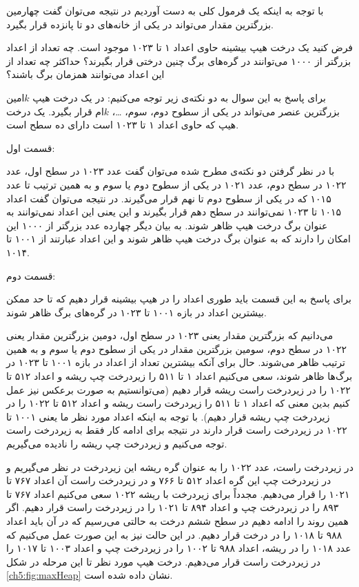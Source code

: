 با توجه به اینکه یک فرمول کلی به دست آوردیم در نتیجه می‌توان گفت چهارمین بزرگترین مقدار می‌تواند در یکی از خانه‌های دو تا پانزده قرار بگیرد.

 فرض کنید یک درخت هیپ  بیشینه حاوی اعداد ۱ تا ۱۰۲۳ موجود است. چه تعداد از اعداد بزرگتر از ۱۰۰۰ می‌توانند در گره‌های برگ چنین درختی قرار بگیرند؟ حداکثر چه تعداد از این اعداد می‌توانند همزمان برگ باشند؟


برای پاسخ به این سوال به دو نکته‌ی زیر توجه می‌کنیم:
 در یک درخت هیپ {$k$}امین بزرگترین عنصر می‌تواند در یکی از سطوح دوم، سوم، {\ldots}، {$k$}ام قرار بگیرد.
  یک درخت هیپ که حاوی اعداد ۱ تا ۱۰۲۳ است دارای ده سطح است.

قسمت اول:

با در نظر گرفتن دو نکته‌ی مطرح شده می‌توان گفت عدد ۱۰۲۳ در سطح اول، عدد ۱۰۲۲ در سطح دوم، عدد ۱۰۲۱ در یکی از سطوح دوم یا سوم و به همین ترتیب تا عدد ۱۰۱۵ که در یکی از سطوح دوم تا نهم قرار می‌گیرند. در نتیجه می‌توان گفت اعداد ۱۰۱۵ تا ۱۰۲۳ نمی‌توانند در سطح دهم قرار بگیرند و این یعنی این اعداد نمی‌توانند به عنوان برگ درخت هیپ ظاهر شوند. به بیان دیگر چهارده عدد بزرگتر از ۱۰۰۰ این امکان را دارند که به عنوان برگ درخت هیپ ظاهر شوند و این اعداد عبارتند از ۱۰۰۱ تا ۱۰۱۴.

قسمت دوم:

برای پاسخ به این قسمت باید طوری اعداد را در هیپ بیشینه قرار دهیم که تا حد ممکن بیشترین اعداد در بازه ۱۰۰۱ تا ۱۰۲۳ در گره‌های برگ ظاهر شوند.

می‌دانیم که بزرگترین مقدار یعنی ۱۰۲۳ در سطح اول، دومین بزرگترین مقدار یعنی ۱۰۲۲ در سطح دوم، سومین بزرگترین مقدار در یکی از سطوح دوم یا سوم و به همین ترتیب ظاهر می‌شوند. حال برای آنکه بیشترین تعداد از اعداد در بازه ۱۰۰۱ تا ۱۰۲۳ در برگ‌ها ظاهر شوند، سعی می‌کنیم اعداد ۱ تا ۵۱۱ را زیردرخت چپ ریشه و اعداد ۵۱۲ تا ۱۰۲۲ را در زیردرخت راست ریشه قرار دهیم (می‌توانستیم به صورت برعکس نیز عمل کنیم بدین معنی که اعداد ۱ تا ۵۱۱ را زیردرخت راست ریشه و اعداد ۵۱۲ تا ۱۰۲۲ را در زیردرخت چپ ریشه قرار دهیم). با توجه به اینکه اعداد مورد نظر ما یعنی ۱۰۰۱ تا ۱۰۲۲ در زیردرخت راست قرار دارند در نتیجه برای ادامه کار فقط به زیردرخت راست توجه می‌کنیم و زیردرخت چپ ریشه را نادیده می‌گیریم. 

در زیردرخت راست، عدد ۱۰۲۲ را به عنوان گره ریشه این زیردرخت در نظر می‌گیریم  و در زیردرخت چپ این گره اعداد ۵۱۲ تا ۷۶۶ و در زیردرخت راست آن اعداد ۷۶۷ تا ۱۰۲۱ را قرار می‌دهیم. مجدداً برای زیردرخت با ریشه ۱۰۲۲ سعی می‌کنیم اعداد ۷۶۷ تا ۸۹۳ را در زیردرخت چپ و اعداد ۸۹۴ تا ۱۰۲۱ را در زیردرخت راست قرار دهیم.  اگر همین روند را ادامه دهیم در سطح ششم درخت به حالتی می‌رسیم که در آن باید اعداد ۹۸۸ تا ۱۰۱۸ را در درخت قرار دهیم. در این حالت نیز به این صورت عمل می‌کنیم که عدد ۱۰۱۸ را در ریشه، اعداد ۹۸۸ تا ۱۰۰۲ را در زیردرخت چپ و اعداد ۱۰۰۳ تا ۱۰۱۷ را در زیردرخت راست قرار می‌دهیم. درخت هیپ مورد نظر تا این مرحله در شکل {\ref{ch5:fig:maxHeap}} نشان داده شده است.

